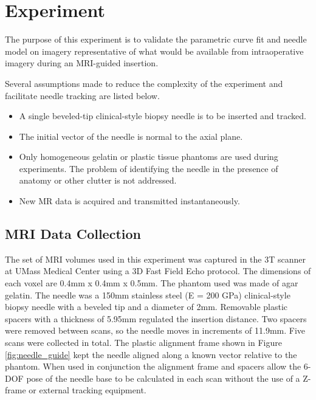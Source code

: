 \section{Experiment}

The purpose of this experiment is to validate the parametric curve fit and needle model on imagery representative of what would be available from intraoperative imagery during an MRI-guided insertion.

Several assumptions made to reduce the complexity of the experiment and facilitate needle tracking are listed below.

\begin{itemize}
\item A single beveled-tip clinical-style biopsy needle is to be inserted and tracked.
\item The initial vector of the needle is normal to the axial plane.
\item Only homogeneous gelatin or plastic tissue phantoms are used during experiments. The problem of identifying the needle in the presence of anatomy or other clutter is not addressed.
\item New MR data is acquired and transmitted instantaneously.
\end{itemize}

\subsection{MRI Data Collection}
The set of MRI volumes used in this experiment was captured in the 3T scanner at UMass Medical Center using a 3D Fast Field Echo protocol. The dimensions of each voxel are 0.4mm x 0.4mm x 0.5mm. The phantom used was made of agar gelatin. The needle was a 150mm stainless steel (E = 200 GPa) clinical-style biopsy needle with a beveled tip and a diameter of 2mm. Removable plastic spacers with a thickness of 5.95mm regulated the insertion distance. Two spacers were removed between scans, so the needle moves in increments of 11.9mm. Five scans were collected in total. The plastic alignment frame shown in Figure \ref{fig:needle_guide} kept the needle aligned along a known vector relative to the phantom. When used in conjunction the alignment frame and spacers allow the 6-DOF pose of the needle base to be calculated in each scan without the use of a Z-frame or external tracking equipment.

